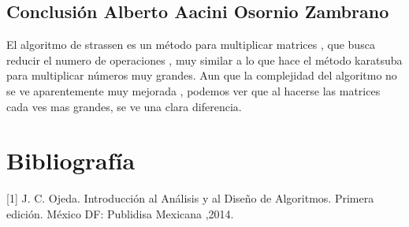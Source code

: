 \documentclass[12pt,twoside]{article}
\begin{document}
\subsection{\textbf{Conclusión Alberto Aacini Osornio Zambrano}}
El algoritmo de strassen es un método para multiplicar matrices , que busca reducir el numero de operaciones , muy similar a lo que hace el método karatsuba  para multiplicar números muy grandes. Aun que la complejidad del algoritmo no se ve aparentemente  muy  mejorada , podemos ver que al hacerse las matrices cada ves mas grandes, se ve una clara diferencia. 

\section{Bibliografía}

[1] J. C. Ojeda. Introducción al Análisis y al Diseño de Algoritmos. Primera edición. México DF: Publidisa Mexicana ,2014. 
\end{document}

